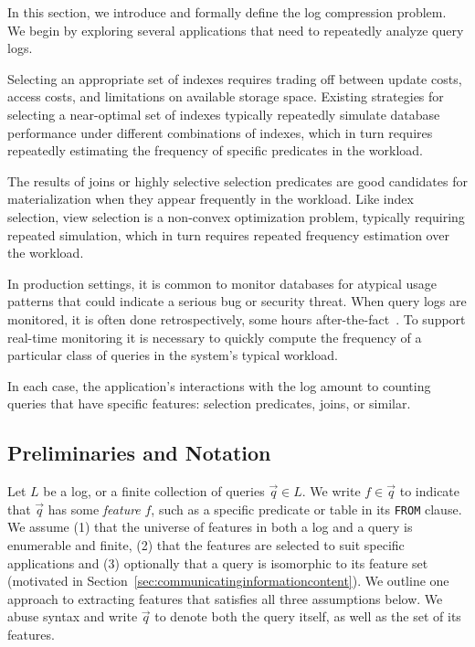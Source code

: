 In this section, we introduce and formally define the log compression problem.
We begin by exploring several applications that need to repeatedly analyze query logs.

Selecting an appropriate set of indexes requires trading off between update costs, access costs, and limitations on available storage space.
Existing strategies for selecting a near-optimal set of indexes typically repeatedly simulate database performance under different combinations of indexes, which in turn requires repeatedly estimating the frequency of specific predicates in the workload.

The results of joins or highly selective selection predicates are good candidates for materialization when they appear frequently in the workload.  
Like index selection, view selection is a non-convex optimization problem, typically requiring repeated simulation, which in turn requires repeated frequency estimation over the workload.

In production settings, it is common to monitor databases for atypical usage patterns that could indicate a serious bug or security threat.
When query logs are monitored, it is often done retrospectively, some hours after-the-fact~\cite{DBLP:conf/www/KulLXCCKU16}.  
To support real-time monitoring it is necessary to quickly compute the frequency of a particular class of queries in the system's typical workload.

\smallskip

In each case, the application's interactions with the log amount to counting queries that have specific features: selection predicates, joins, or similar.

\subsection{Preliminaries and Notation}
\label{sec:notation}
Let $L$ be a log, or a finite collection of queries $\vec q \in L$.
We write $f \in \vec q$ to indicate that $\vec q$ has some \emph{feature} $f$, such as a specific predicate or table in its \lstinline{FROM} clause.
We assume (1) that the universe of features in both a log and a query is enumerable and finite, (2) that the features are selected to suit specific applications and (3) optionally that a query is isomorphic to its feature set (motivated in Section~\ref{sec:communicatinginformationcontent}).  
We outline one approach to extracting features that satisfies all three assumptions below.
We abuse syntax and write $\vec q$ to denote both the query itself, as well as the set of its features.  

